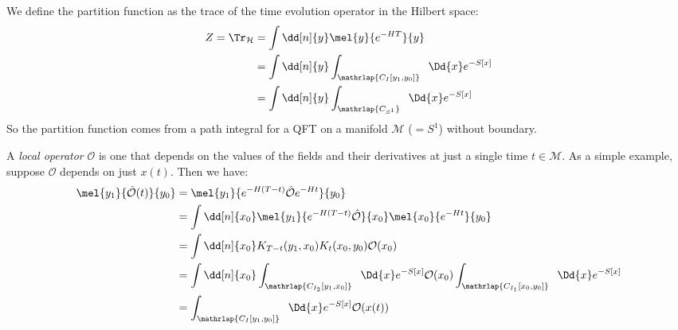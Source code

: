 \documentclass{jknotes}
\begin{document}
We define the partition function as the trace of the time evolution operator in the Hilbert space:
\begin{align}
    Z = \Tr_\mathcal{H} &= \int \dd[n]{y}\mel{y}{e^{-HT}}{y} \\
    &= \int\dd[n]{y}\int_{\mathrlap{C_I[y_1,y_0]}} \;\; \Dd{x} e^{-S[x]} \\
    &= \int\dd[n]{y}\int_{\mathrlap{C_{S^1}}} \;\; \Dd{x} e^{-S[x]}
\end{align}
So the partition function comes from a path integral for a QFT on a manifold \(\mathcal{M}\) (\(=S^1\)) without boundary.

A \emph{local operator} \(\mathcal{O}\) is one that depends on the values of the fields and their derivatives at just a single time \(t\in\mathcal{M}\). As a simple example, suppose \(\mathcal{O}\) depends on just \(x(t)\). Then we have:
\begin{align}
    \mel{y_1}{\hat{\mathcal{O}}(t)}{y_0} &= \mel{y_1}{e^{-H(T-t)}\hat{\mathcal{O}}e^{-Ht}}{y_0} \\
    &= \int \dd[n]{x_0} \mel{y_1}{e^{-H(T-t)}\hat{\mathcal{O}}}{x_0} \mel{x_0}{e^{-Ht}}{y_0} \\
    &= \int \dd[n]{x_0} K_{T-t}(y_1,x_0)K_t(x_0,y_0) \mathcal{O}(x_0) \\
    &= \int \dd[n]{x_0} \int_{\mathrlap{C_{I_2}[y_1,x_0]}} \;\; \Dd{x} e^{-S[x]} \mathcal{O}(x_0) \int_{\mathrlap{C_{I_1}[x_0,y_0]}} \;\; \Dd{x} e^{-S[x]} \\
    &= \int_{\mathrlap{C_I[y_1,y_0]}} \;\; \Dd{x} e^{-S[x]} \mathcal{O}(x(t))
\end{align}
\end{document}
